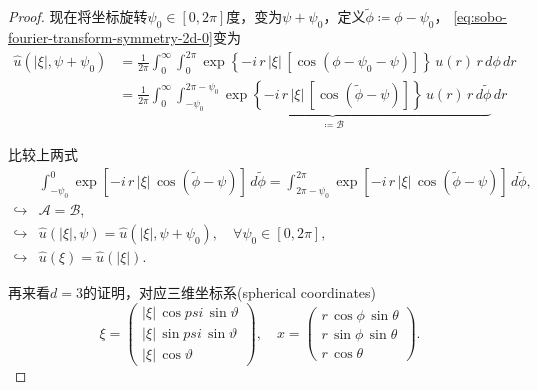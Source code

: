 \begin{proof}
现在将坐标旋转$\psi_0 \in [0, 2 \pi]$度，变为$\psi + \psi_0$，定义$\widetilde{\phi} \coloneqq \phi - \psi_0$，  \eqref{eq:sobo-fourier-transform-symmetry-2d-0}变为
\begin{equation}
  \label{eq:sobo-fourier-transform-symmetry-2d-1}
  \begin{split}
    \widehat{u}\left(\left| \xi \right|, \psi + \psi_0 \right) &=
    \frac{1}{2\pi} \int_{0}^{\infty} \int_{0}^{2 \pi}
    \exp \left\{
    - i \, r \, \left| \xi \right| \,
    \left[
    \cos \left( \phi - \psi_0 - \psi \right)
    \right]
    \right\} \,
    u(r) \, r \, d \phi \, d r \\
    &= \frac{1}{2\pi} \int_{0}^{\infty} \underbrace{\int_{-\psi_0}^{2 \pi - \psi_0}
    \exp \left\{
    - i \, r \, \left| \xi \right| \,
    \left[
    \cos \left( \widetilde{\phi} - \psi \right)
    \right]
    \right\} \,
    u(r) \, r \, d \widetilde{\phi} }_{\coloneqq \mathcal{B}}\, d r
  \end{split}
\end{equation}

比较上两式
\begin{equation}
\label{eq:sobo-fourier-transform-symmetry-2d-2}
\begin{split}
  & \int_{-\psi_0}^{0} \exp
  \left[
  - i \, r \, \left| \xi \right| \, \cos \left( \widetilde{\phi} - \psi \right)
  \right] \, d \widetilde{\phi}
  = \int_{2 \pi - \psi_0}^{2 \pi} \exp
  \left[
  - i \, r \, \left| \xi \right| \, \cos \left( \widetilde{\phi} - \psi \right)
  \right] \, d \widetilde{\phi}, \\
  \hookrightarrow & \mathcal{A} = \mathcal{B},\\
  \hookrightarrow & \widehat{u}\left( \left| \xi \right|, \psi \right)
  = \widehat{u} \left( \left| \xi \right|, \psi+\psi_0 \right), \quad \forall \psi_0 \in [0, 2\pi], \\
  \hookrightarrow  & \widehat{u}(\xi) = \widehat{u} \left( \left| \xi \right| \right).
\end{split}
\end{equation}

再来看$d=3$的证明，对应三维坐标系(spherical coordinates)
\begin{equation*}
  \xi = \begin{pmatrix}
  \left| \xi \right| \, \cos psi \, \sin \vartheta\\
  \left| \xi \right| \, \sin psi \, \sin \vartheta\\
  \left| \xi \right| \, \cos \vartheta
  \end{pmatrix}, \quad
  x = \begin{pmatrix}
  r \, \cos \phi \, \sin \theta \\
  r \, \sin \phi \, \sin \theta \\
  r \, \cos \theta
  \end{pmatrix}.
\end{equation*}


\end{proof}
